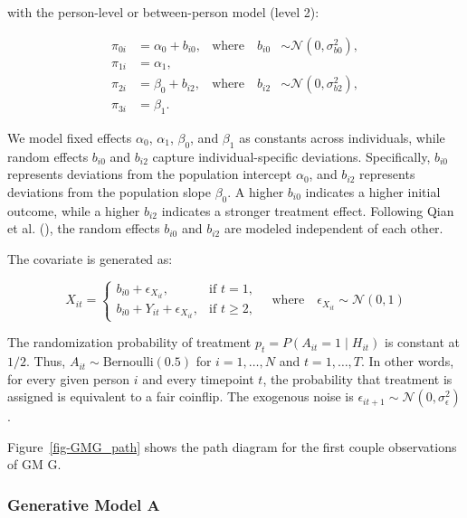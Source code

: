 \documentclass[
  11pt,
  a4paper,
]{article}
\begin{document}
with the person-level or between-person model (level 2):

\[
\begin{aligned}
\pi_{0i} &= \alpha_0 + b_{i0}, & \text{where} \quad b_{i0} &\sim \mathcal{N}(0, \sigma_{b0}^2), \\
\pi_{1i} &= \alpha_1, \\
\pi_{2i} &= \beta_0 + b_{i2}, & \text{where} \quad b_{i2} &\sim \mathcal{N}(0, \sigma_{b2}^2), \\
\pi_{3i} &= \beta_1.
\end{aligned}
\]

We model fixed effects \(\alpha_0\), \(\alpha_1\), \(\beta_0\), and
\(\beta_1\) as constants across individuals, while random effects
\(b_{i0}\) and \(b_{i2}\) capture individual-specific deviations.
Specifically, \(b_{i0}\) represents deviations from the population
intercept \(\alpha_0\), and \(b_{i2}\) represents deviations from the
population slope \(\beta_0\). A higher \(b_{i0}\) indicates a higher
initial outcome, while a higher \(b_{i2}\) indicates a stronger
treatment effect. Following Qian et al. (),
the random effects \(b_{i0}\) and \(b_{i2}\) are modeled independent of
each other.

The covariate is generated as:

\[
X_{it} = 
\begin{cases} 
b_{i0} + \epsilon_{X_{it}}, & \text{if } t = 1, \\
b_{i0} + Y_{it} + \epsilon_{X_{it}}, & \text{if } t \geq 2,
\end{cases}
\quad \text{where} \quad \epsilon_{X_{it}} \sim \mathcal{N}(0, 1)
\]

The randomization probability of treatment
\(p_t = P(A_{it} = 1 \mid H_{it})\) is constant at \(1/2\). Thus,
\(A_{it} \sim \text{Bernoulli}(0.5)\) for \(i = 1, \ldots, N\) and
\(t = 1, \ldots, T\). In other words, for every given person \(i\) and
every timepoint \(t\), the probability that treatment is assigned is
equivalent to a fair coinflip. The exogenous noise is
\(\epsilon_{it+1} \sim \mathcal{N}(0, \sigma_\epsilon^2)\).

Figure~\ref{fig-GMG_path} shows the path diagram for the first couple
observations of GM G.

\subsubsection{Generative Model A}\label{generative-model-a}
\end{document}
